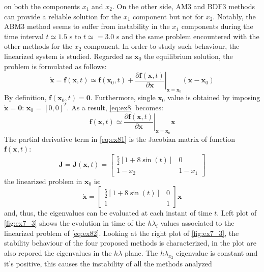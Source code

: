 \documentclass[11pt,a4paper,oneside]{article}
\renewcommand{\vec}[1]{\mathbf{#1}}
\begin{document}
on both the components $x_1$ and $x_2$. On the other side, AM3 and BDF3 methods can provide a reliable 
solution for the $x_1$ component but not for $x_2$. Notably, the ABM3 method seems to suffer from instability 
in the $x_1$ components during the time interval $t\simeq1.5$ s to $t\simeq=3.0$ s and the same problem encountered 
with the other methods for the $x_2$ component.
In order to study such behaviour, the linearized system is studied. Regarded as $\vec{x}_0$ the 
equilibrium solution, the problem is formulated as follows:
\begin{equation}
    \dot{\vec{x}} = \vec{f}(\vec{x}, t) \simeq \vec{f}(\vec{x}_0, t) + \left.\frac{\partial \vec{f}(\vec{x}, t)}{\partial \vec{x}} \right\rvert_{\vec{x}=\vec{x}_0}(\vec{x}-\vec{x}_0)
    \label{eq:ex8}
\end{equation}
By definition, $\vec{f}(\vec{x}_0,t) = \vec{0}$. Furthermore, single $\vec{x}_0$ value is obtained by imposing $\dot{\vec{x}}=\vec{0}$: $\vec{x}_0$ = $[0, 0]^T$. As a result, \autoref{eq:ex8} becomes:
\begin{equation}
    \vec{f}(\vec{x}, t) \simeq \left.\frac{\partial \vec{f}(\vec{x}, t)}{\partial \vec{x}} \right\rvert_{\vec{x}=\vec{x}_0} \vec{x}
    \label{eq:ex81}
\end{equation}
The partial derivative term in \autoref{eq:ex81} is the Jacobian matrix of function $\vec{f}(\vec{x}, t)$:
\begin{equation}
    \vec{J} = \vec{J}(\vec{x},t) = \begin{bmatrix}
\frac{5}{2}\left[1+8\sin(t)\right] & 0\\
1-x_2 & 1-x_1
\end{bmatrix}
\end{equation}
the linearized problem in $\vec{x}_0$ is:
\begin{equation}
    \dot{\vec{x}}=\begin{bmatrix}
\frac{5}{2}\left[1+8\sin(t)\right] & 0\\
1 & 1
\end{bmatrix}\vec{x}
\label{eq:ex82}
\end{equation}
and, thus, the eigenvalues can be evaluated at each instant of time $t$.
Left plot of \autoref{fig:ex7_3} shows the evolution in time of the $h\lambda_i$ values associated to the 
linearized problem of \autoref{eq:ex82}. Looking at the right plot of \autoref{fig:ex7_3}, the stability behaviour of 
the four proposed methods is characterized, in the plot are also repored the eigenvalues in the $h\lambda$ plane. 
The $h\lambda_{x_2}$ eigenvalue is constant and it's positive, this causes the instability of all the methods analyzed
\end{document}
